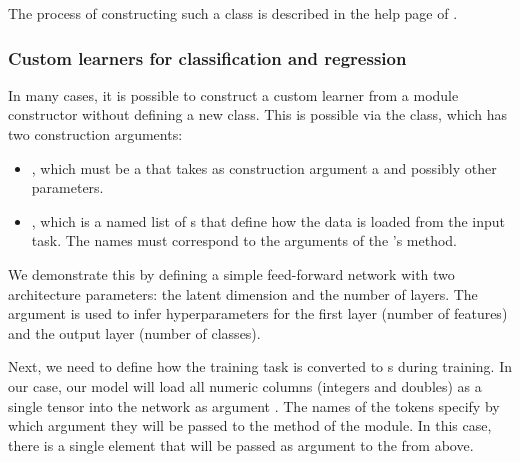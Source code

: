 \documentclass[article]{jss}
\theoremstyle{definition}
\begin{document}
The process of constructing such a class is described in the help page of .

\subsubsection{Custom learners for classification and regression}\label{sec:extending-learner}

In many cases, it is possible to construct a custom learner from a module constructor without defining a new class.
This is possible via the  class, which has two construction arguments:
\begin{itemize}
    \item {}, which must be a  that takes as construction argument a  and possibly other parameters.
    \item {}, which is a named list of s that define how the data is loaded from the input task. The names must correspond to the arguments of the 's  method.
\end{itemize}

We demonstrate this by defining a simple feed-forward network with two architecture parameters: the latent dimension and the number of layers.
The  argument is used to infer hyperparameters for the first layer (number of features) and the output layer (number of classes).


Next, we need to define how the training task is converted to s during training.
In our case, our model will load all numeric columns (integers and doubles) as a single tensor into the network as argument .
The names of the tokens specify by which argument they will be passed to the  method of the module.
In this case, there is a single element that will be passed as argument  to the  from above.
\end{document}
